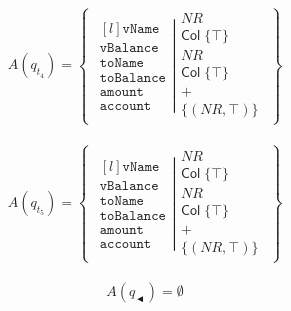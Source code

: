 \begin{align}
    A(q_{t_4})=\left\{\begin{matrix}
                          \left.\begin{matrix*}[l]
                                    \texttt{vName}\\
                                    \texttt{vBalance}\\
                                    \texttt{toName}\\
                                    \texttt{toBalance}\\
                                    \texttt{amount}\\
                                    \texttt{account}
                          \end{matrix*}\right|
                          \begin{matrix}
                              NR\\
                              \mathsf{Col} \; \{\top\}\\
                              NR\\
                              \mathsf{Col} \; \{\top\}\\
                              +\\
                              \{(NR, \top)\}
                          \end{matrix}
    \end{matrix}\right\}
\end{align}

\begin{align}
    \label{eq:example-fixed-point-7}
    A(q_{t_5})=\left\{\begin{matrix}
                          \left.\begin{matrix*}[l]
                                    \texttt{vName}\\
                                    \texttt{vBalance}\\
                                    \texttt{toName}\\
                                    \texttt{toBalance}\\
                                    \texttt{amount}\\
                                    \texttt{account}
                          \end{matrix*}\right|
                          \begin{matrix}
                              NR\\
                              \mathsf{Col} \; \{\top\}\\
                              NR\\
                              \mathsf{Col} \; \{\top\}\\
                              +\\
                              \{(NR, \top)\}
                          \end{matrix}
    \end{matrix}\right\}
\end{align}

\begin{align}
\label{eq:example-fixed-point-8}
    A(q_{\blackpointerleft})=\emptyset
\end{align}

